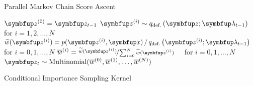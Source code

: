 \begin{center}
  \begin{center}
\begin{minipage}[c]{0.7\textwidth}
  \begin{algorithm2e}[H]
    \DontPrintSemicolon
    \SetAlgoLined
    \caption{Parallel Markov Chain Score Ascent}\label{alg:pmcsa}
  \end{algorithm2e}
\end{minipage}
  \end{center}

  \begin{center}
\begin{minipage}[c]{0.63\textwidth}
  \begin{algorithm2e}[H]
    \DontPrintSemicolon
    \SetAlgoLined
    \(\vz^{(0)} = \vz_{t-1}\) \;
    \(\vz^{(i)} \sim q_{\text{def.}}\left(\vz;\vlambda_{t-1}\right)\quad\) for \(i = 1, 2,\ldots, N\) \;
    \(\widetilde{w}(\vz^{(i)}) = p(\vz^{(i)},\vx) \,/\, q_{\text{def.}}\left(\vz^{(i)}; \vlambda_{t-1}\right)\quad\) for \(i = 0, 1,\ldots, N\)\;
    \(\overline{w}^{(i)} = \nicefrac{\widetilde{w}(\vz^{(i)})}{ \sum^{N}_{i=0} \widetilde{w}(\vz^{(i)}) }\quad\) for \(i = 0, 1,\ldots, N\)\;
    \(\vz_{t} \sim \mathrm{Multinomial}(\overline{w}^{(0)}, \overline{w}^{(1)}, \ldots, \overline{w}^{(N)}) \)\;
    \caption{Conditional Importance Sampling Kernel}
  \end{algorithm2e}
\end{minipage}
  \end{center}


\end{center}
